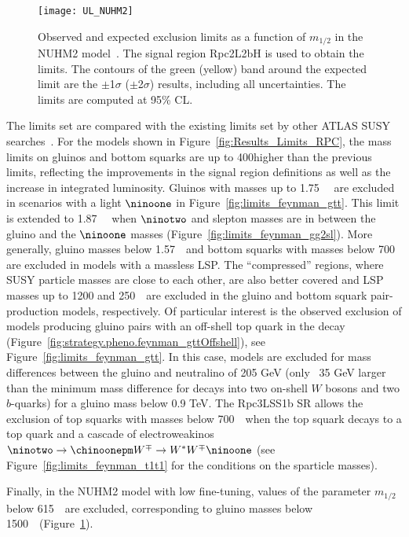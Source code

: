 \begin{figure}[b]
\centering
\texttt{[image: UL\_NUHM2]}\label{fig:limits_feynman_nuhm2}
\caption{Observed and expected exclusion limits as a function of $m_{1/2}$ in the NUHM2 model~\cite{Ellis:2002iu,Ellis:2002wv}.
The signal region Rpc2L2bH is used to obtain the limits. 
The contours of the green (yellow) band around the expected limit are the $\pm$1$\sigma$ ($\pm$2$\sigma$) results, including all uncertainties. The limits are computed at 95\% CL.}
\label{fig:Results_Limits_NUHM2} 
\end{figure} 

The limits set are compared with the existing limits set by other ATLAS SUSY 
searches~\cite{paperSS3L,Aad:2016jxj}. For the models shown in Figure~\ref{fig:Results_Limits_RPC}, 
the mass limits on gluinos and bottom squarks are up to 400\GeV higher than the previous limits, reflecting the improvements 
in the signal region definitions as well as the increase in integrated luminosity. Gluinos with masses up to 1.75~\TeV~
are excluded in scenarios with a light $\ninoone$ in Figure~\ref{fig:limits_feynman_gtt}. This limit is extended to 1.87~\TeV~ when 
$\ninotwo$ and slepton masses are in between the gluino and the $\ninoone$ masses (Figure~\ref{fig:limits_feynman_gg2sl}). More generally, gluino masses 
below 1.57~\TeV~and bottom squarks with masses below 700~\GeV 
are excluded in models with a massless LSP. The ``compressed'' regions, where SUSY particle masses are close to each other, are also better covered 
and LSP masses up to 1200 and 250~\GeV~are excluded in the gluino and bottom squark pair-production models, respectively. Of particular
interest is the observed exclusion of models producing gluino pairs with an off-shell top quark in the decay (Figure~\ref{fig:strategy.pheno.feynman_gttOffshell}), 
see Figure~\ref{fig:limits_feynman_gtt}. In this case, models are excluded for mass differences between the gluino and neutralino of 205 GeV (only ~35 GeV
larger than the minimum mass difference for decays into two on-shell $W$ bosons and two $b$-quarks) for a gluino mass below 0.9
TeV. The Rpc3LSS1b SR allows the exclusion of top squarks with masses below 700~\GeV~when the top squark decays to a top quark and a cascade of electroweakinos 
$\ninotwo \to \chinoonepm W^{\mp} \to W^{*} W^{\mp} \ninoone$ (see Figure~\ref{fig:limits_feynman_t1t1} for the conditions 
on the sparticle masses).


Finally, in the NUHM2 model with low fine-tuning, values of the parameter $m_{1/2}$ below 615~\GeV~are excluded, 
corresponding to gluino masses below 1500~\GeV~(Figure~\ref{fig:Results_Limits_NUHM2}).
